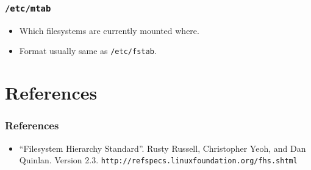 \documentclass[xcolor={dvipsnames,svgnames},hyperref=dvips]{beamer}
\begin{document}
	\begin{frame}
		\frametitle{\texttt{/etc/mtab}}
		\begin{itemize}
			\item Which filesystems are currently mounted where.
			\item Format usually same as \texttt{/etc/fstab}.
		\end{itemize}
	\end{frame}

\section{References}

\begin{frame}
	\frametitle{References}
	\begin{itemize}
	\item ``Filesystem Hierarchy Standard''. Rusty Russell, Christopher Yeoh, and Dan Quinlan. Version 2.3. \texttt{http://refspecs.linuxfoundation.org/fhs.shtml}
	\end{itemize}
\end{frame}
\end{document}
